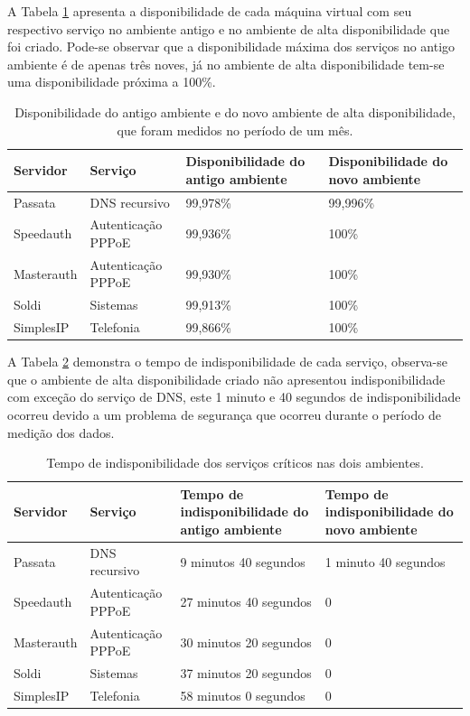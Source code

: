 A Tabela \ref{tab:testefinal} apresenta a disponibilidade de cada máquina virtual com seu respectivo serviço no ambiente antigo e no 
ambiente de alta disponibilidade que foi criado. Pode-se observar que a disponibilidade máxima dos serviços no antigo ambiente é de apenas três 
noves, já no ambiente de alta disponibilidade tem-se uma disponibilidade próxima a 100\%.

\begin{table}[h!]
\caption{Disponibilidade do antigo ambiente e do novo ambiente de alta disponibilidade, que foram medidos no período de um mês.}
\small
\label{tab:testefinal}
\begin{center}
\begin{tabular}{|l|l|p{4cm}|p{4cm}|}\hline
\textbf{Servidor} & \textbf{Serviço} & \textbf{Disponibilidade do antigo ambiente} & \textbf{Disponibilidade do novo ambiente} \\\hline
Passata & DNS recursivo & 99,978\% & 99,996\% \\\hline
Speedauth & Autenticação \ac{PPPoE} & 99,936\% & 100\% \\\hline
Masterauth & Autenticação \ac{PPPoE} & 99,930\% & 100\% \\\hline
Soldi & Sistemas & 99,913\% & 100\% \\\hline
SimplesIP & Telefonia & 99,866\% & 100\% \\\hline
\end{tabular}
\end{center}
\end{table}

A Tabela \ref{tab:testefinal2} demonstra o tempo de indisponibilidade de cada serviço, observa-se que o ambiente de alta disponibilidade
criado não apresentou indisponibilidade com exceção do serviço de \ac{DNS}, este 1 minuto e 40 segundos de indisponibilidade ocorreu devido 
a um problema de segurança que ocorreu durante o período de medição dos dados.

\begin{table}[h!]
\caption{Tempo de indisponibilidade dos serviços críticos nas dois ambientes.}
\small
\label{tab:testefinal2}
\begin{center}
\begin{tabular}{|l|l|p{4cm}|p{4cm}|}\hline
\textbf{Servidor} & \textbf{Serviço} & \textbf{Tempo de indisponibilidade do antigo ambiente} & \textbf{Tempo de indisponibilidade do novo ambiente} \\\hline
Passata & DNS recursivo & 9 minutos 40 segundos & 1 minuto 40 segundos \\\hline
Speedauth & Autenticação \ac{PPPoE} & 27 minutos 40 segundos & 0 \\\hline
Masterauth & Autenticação \ac{PPPoE} & 30 minutos 20 segundos & 0 \\\hline
Soldi & Sistemas & 37 minutos 20 segundos & 0 \\\hline
SimplesIP & Telefonia & 58 minutos 0 segundos & 0 \\\hline
\end{tabular}
\end{center}
\end{table}


